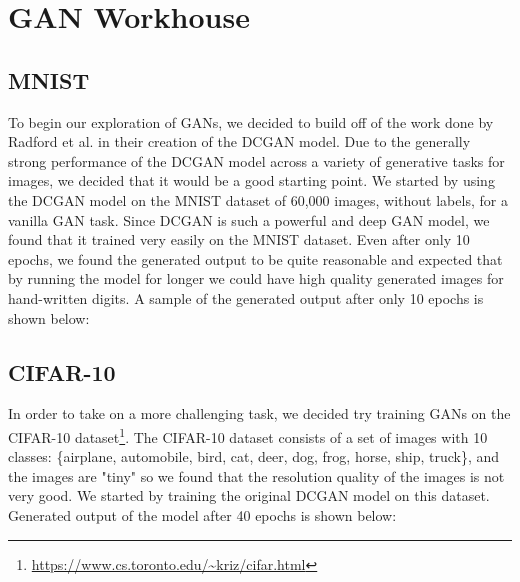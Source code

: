 \documentclass[a4paper]{article}
\begin{document}
\begin{enumerate}
{

}
\end{enumerate}

\section{GAN Workhouse}

\subsection{MNIST}
To begin our exploration of GANs, we decided to build off of the work done by Radford et al. in their creation of the DCGAN model. Due to the generally strong performance of the DCGAN model across a variety of generative tasks for images, we decided that it would be a good starting point. We started by using the DCGAN model on the MNIST dataset of 60,000 images, without labels, for a vanilla GAN task. Since DCGAN is such a powerful and deep GAN model, we found that it trained very easily on the MNIST dataset. Even after only 10 epochs, we found the generated output to be quite reasonable and expected that by running the model for longer we could have high quality generated images for hand-written digits. A sample of the generated output after only 10 epochs is shown below:

\subsection{CIFAR-10}
In order to take on a more challenging task, we decided try training GANs on the CIFAR-10 dataset\footnote{\url{https://www.cs.toronto.edu/~kriz/cifar.html}}. The CIFAR-10 dataset consists of a set of images with 10 classes: \{airplane, automobile, bird, cat, deer, dog, frog, horse, ship, truck\}, and the images are "tiny" so we found that the resolution quality of the images is not very good. We started by training the original DCGAN model on this dataset. Generated output of the model after 40 epochs is shown below:
\end{document}
